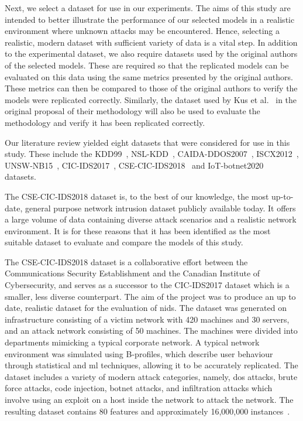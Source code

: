 Next, we select a dataset for use in our experiments. The aims of this study
are intended to better illustrate the performance of our selected models in a
realistic environment where unknown attacks may be encountered. Hence,
selecting a realistic, modern dataset with sufficient variety of data is a
vital step. In addition to the experimental dataset, we also require datasets
used by the original authors of the selected models. These are required so that
the replicated models can be evaluated on this data using the same metrics
presented by the original authors. These metrics can then be compared to those
of the original authors to verify the models were replicated correctly.
Similarly, the dataset used by Kus et al.~\cite{Kus} in the original proposal
of their methodology will also be used to evaluate the methodology and verify
it has been replicated correctly.

Our literature review yielded eight datasets that were considered for use in
this study. These include the KDD99~\cite{kdd99}, NSL-KDD~\cite{nsl},
CAIDA-DDOS2007~\cite{caida}, ISCX2012~\cite{iscx12}, UNSW-NB15~\cite{unsw15},
CIC-IDS2017~\cite{cic2017}, CSE-CIC-IDS2018~\cite{cic2018} and
IoT-botnet2020~\cite{iot_botnet20} datasets.

The CSE-CIC-IDS2018 dataset is, to the best of our knowledge, the most
up-to-date, general purpose network intrusion dataset publicly available today.
It offers a large volume of data containing diverse attack scenarios and a
realistic network environment. It is for these reasons that it has been
identified as the most suitable dataset to evaluate and compare the models of
this study.

The CSE-CIC-IDS2018 dataset is a collaborative effort between the
Communications Security Establishment and the Canadian Institute of
Cybersecurity, and serves as a successor to the CIC-IDS2017 dataset which is a
smaller, less diverse counterpart. The aim of the project was to produce an up
to date, realistic dataset for the evaluation of \gls{nids}. The dataset was
generated on infrastructure consisting of a victim network with 420 machines
and 30 servers, and an attack network consisting of 50 machines. The machines
were divided into departments mimicking a typical corporate network. A typical
network environment was simulated using B-profiles, which describe user
behaviour through statistical and \gls{ml} techniques, allowing it to be
accurately replicated. The dataset includes a variety of modern attack
categories, namely, \gls{dos} attacks, brute force attacks, code injection,
botnet attacks, and infiltration attacks which involve using an exploit on a
host inside the network to attack the network. The resulting dataset contains
80 features and approximately 16,000,000 instances~\cite{cic2018, cic2018data}.


